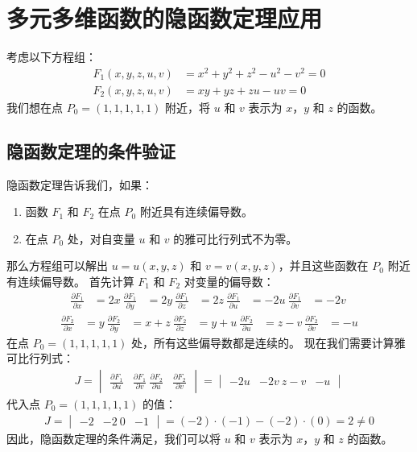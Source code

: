 \documentclass{ctexart}  %
\begin{document}
\section{多元多维函数的隐函数定理应用}
考虑以下方程组：
\begin{align}  %
F_1(x, y, z, u, v) &= x^2 + y^2 + z^2 - u^2 - v^2 = 0\\
F_2(x, y, z, u, v) &= xy + yz + zu - uv = 0
\end{align}
我们想在点 \(P_0 = (1, 1, 1, 1, 1)\) 附近，将 \(u\) 和 \(v\) 表示为 \(x\)，\(y\) 和 \(z\) 的函数。
\subsection {隐函数定理的条件验证}
隐函数定理告诉我们，如果：
\begin {enumerate}
\item 函数 \(F_1\) 和 \(F_2\) 在点 \(P_0\) 附近具有连续偏导数。
\item 在点 \(P_0\) 处，对自变量 \(u\) 和 \(v\) 的雅可比行列式不为零。
\end {enumerate}
那么方程组可以解出 \(u = u(x, y, z)\) 和 \(v = v(x, y, z)\)，并且这些函数在 \(P_0\) 附近有连续偏导数。
首先计算 \(F_1\) 和 \(F_2\) 对变量的偏导数：
\begin{align}
\frac{\partial F_1}{\partial x} &= 2x \
\frac{\partial F_1}{\partial y} &= 2y \
\frac{\partial F_1}{\partial z} &= 2z \
\frac{\partial F_1}{\partial u} &= -2u \
\frac{\partial F_1}{\partial v} &= -2v \
\end{align}
\begin{align}
\frac{\partial F_2}{\partial x} &= y \
\frac{\partial F_2}{\partial y} &= x + z \
\frac{\partial F_2}{\partial z} &= y + u \
\frac{\partial F_2}{\partial u} &= z - v \
\frac{\partial F_2}{\partial v} &= -u
\end{align}
在点 \(P_0 = (1, 1, 1, 1, 1)\) 处，所有这些偏导数都是连续的。
现在我们需要计算雅可比行列式：
\begin {align}
J = \begin {vmatrix}
\frac {\partial F_1}{\partial u} & \frac {\partial F_1}{\partial v} \
\frac {\partial F_2}{\partial u} & \frac {\partial F_2}{\partial v}
\end {vmatrix}
= \begin {vmatrix}
-2u & -2v \
z - v & -u
\end {vmatrix}
\end {align}
代入点 \(P_0 = (1, 1, 1, 1, 1)\) 的值：
\begin {align}
J = \begin {vmatrix}
-2 & -2 \
0 & -1
\end {vmatrix}
= (-2) \cdot (-1) - (-2) \cdot (0) = 2 \neq 0
\end {align}
因此，隐函数定理的条件满足，我们可以将 \(u\) 和 \(v\) 表示为 \(x\)，\(y\) 和 \(z\) 的函数。
\end{document}
